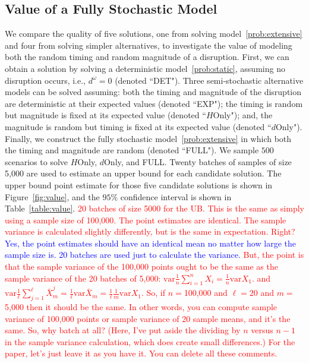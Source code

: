 \documentclass[11pt]{article}
\newcommand{\tcr}{\textcolor{red}}
\newcommand{\tcb}{\textcolor{blue}}
\begin{document}
	\subsection{Value of a Fully Stochastic Model} \label{subsec:value}
	We compare the quality of five solutions, one from solving model~\eqref{prob:extensive} and four from solving simpler alternatives, to investigate the value of modeling both the random timing and random magnitude of a disruption. First, we can obtain a solution by solving a deterministic model~\eqref{prob:static}, assuming no disruption occurs, i.e., $d^\omega=0$ (denoted ``DET"). Three semi-stochastic alternative models can be solved assuming: both the timing and magnitude of the disruption are deterministic at their expected values (denoted ``EXP"); the timing is random but magnitude is fixed at its expected value (denoted ``\(H\)Only"); and, the magnitude is random but timing is fixed at its expected value (denoted ``\(d\)Only"). Finally, we construct the fully stochastic model~\eqref{prob:extensive} in which both the timing and magnitude are random (denoted ``FULL"). We sample \(500\) scenarios to solve \(H\)Only, \(d\)Only, and FULL. Twenty batches of samples of size 5,000 are used to estimate an upper bound for each candidate solution. The upper bound point estimate for those five candidate solutions is shown in Figure~\ref{fig:value}, and the \(95\%\) confidence interval is shown in Table~\ref{table:value}. \tcr{20 batches of size 5000 for the UB. This is the same as simply using a sample size of 100,000. The point estimates are identical. The sample variance is calculated slightly differently, but is the same in expectation. Right?} \tcb{Yes, the point estimates should have an identical mean no matter how large the sample size is. 20 batches are used just to calculate the variance.} \tcr{But, the point is that the sample variance of the 100,000 points ought to be the same as the sample variance of the 20 batches of 5,000: $\mbox{var} \frac{1}{n} \sum_{i=1}^n X_i = \frac{1}{n} \mbox{var} X_1$.  and $\mbox{var} \frac{1}{\ell} \sum_{j=1}^{\ell} \bar{X}^j_m = \frac{1}{\ell} \mbox{var}  \bar{X}_m = \frac{1}{\ell} \frac{1}{m} \mbox{var} X_1$. So, if $n=$100,000 and $\ell=20$ and $m=$5,000 then it should be the same. In other words, you can compute sample variance of 100,000 points or sample variance of 20 sample means, and it's the same. So, why batch at all? (Here, I've put aside the dividing by $n$ versus $n-1$ in the sample variance calculation, which does create small differences.) For the paper, let's just leave it as you have it. You can delete all these comments.}
	
\end{document}
